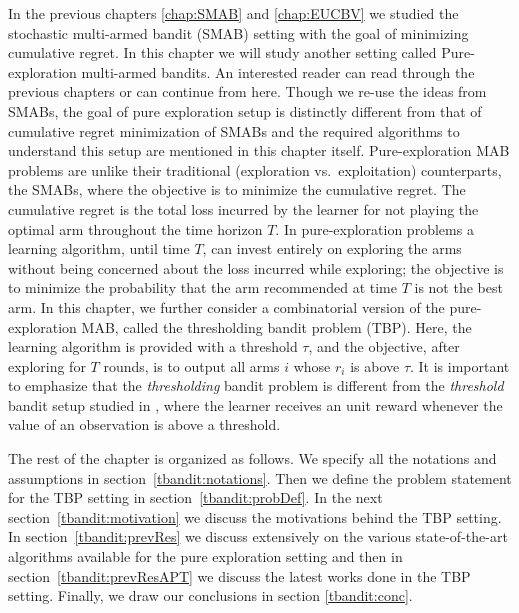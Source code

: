 In the previous chapters \ref{chap:SMAB} and \ref{chap:EUCBV} we studied the stochastic multi-armed bandit (SMAB) setting with the goal of minimizing cumulative regret. In this chapter we will study another setting called Pure-exploration multi-armed bandits. An interested reader can read through the previous chapters or can continue from here. Though we re-use the ideas from SMABs, the goal of pure exploration setup is distinctly different from that of cumulative regret minimization of SMABs and the required algorithms to understand this setup are mentioned in this chapter itself. Pure-exploration MAB problems are unlike their traditional (exploration vs.\ exploitation)  counterparts, the SMABs, where the  objective is to minimize the cumulative regret. The cumulative regret is the total loss incurred by the learner for not playing the optimal arm throughout the time horizon $T$. 
	In pure-exploration problems a learning algorithm, until time $T$, can invest entirely on exploring the arms without being concerned about the loss incurred while exploring; the objective is to minimize the probability that the arm recommended at time $T$ is not the best arm.  In this chapter, we further consider a combinatorial version of the pure-exploration MAB, called the thresholding bandit problem (TBP).  Here, the learning algorithm is provided with a threshold $\tau$, and the objective, after exploring for $T$ rounds, is to  output all arms $i$ whose $r_{i}$ is above $\tau$. 
It is important to emphasize that the \emph{thresholding} bandit problem is different from the \emph{threshold} bandit setup studied in \cite{abernethy2016threshold}, where the learner receives an unit reward whenever the value of an observation is above a threshold. 

	The rest of the chapter is organized as follows. We specify all the notations and assumptions in section~\ref{tbandit:notations}. Then we define the problem statement for the TBP setting in section~\ref{tbandit:probDef}. In the next section~\ref{tbandit:motivation} we discuss the motivations behind the TBP setting. In section~\ref{tbandit:prevRes} we discuss extensively on the various state-of-the-art algorithms available for the pure exploration setting and then in section~\ref{tbandit:prevResAPT} we discuss the latest works done in the TBP setting. Finally, we draw our conclusions in section \ref{tbandit:conc}.

